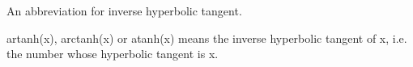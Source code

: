 An abbreviation for inverse hyperbolic tangent.
\par
artanh(x), arctanh(x) or atanh(x)
means the inverse hyperbolic tangent of x, i.e. the number whose 
hyperbolic tangent is x.